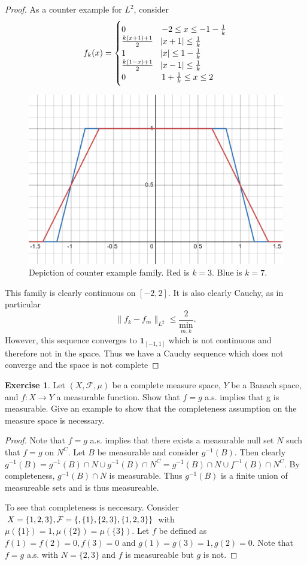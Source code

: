 \documentclass{amsart}
\theoremstyle{plain}
\theoremstyle{definition}
\newtheorem{exer}{Exercise}[section]
\begin{document}
\begin{proof}
    \par As a counter example for $L^2$, consider
    $$f_k(x) = \begin{cases}
        0 & -2\leq x \leq -1-\frac{1}{k}\\
        \frac{k(x+1)+1}{2}& \abs{x+1}\leq \frac{1}{k}\\
        1 & \abs{x}\leq 1-\frac{1}{k}\\
        \frac{k(1-x)+1}{2}& \abs{x-1}\leq \frac{1}{k}\\
        0 & 1+\frac{1}{k}\leq x\leq 2
    \end{cases}$$
    \begin{figure}[h!]
        \centering
        \includegraphics[width=0.5\linewidth]{Exercises/Chapter 1/Photos/Problem1Counter.png}
        \caption{Depiction of counter example family. Red is $k=3$. Blue is $k=7$.}
        \label{fig:Problem_1_counter}
    \end{figure}
    This family is clearly continuous on $[-2,2].$ It is also clearly Cauchy, as in particular
    $$\|f_k - f_m\|_{L^2} \leq \frac{2}{\min_{m,k}}.$$
    However, this sequence converges to $\mathbf{1}_{[-1,1]}$ which is not continuous and therefore not in the space. Thus we have a Cauchy sequence which does not converge and the space is not complete
\end{proof}

\begin{exer}
    Let $\left(X,\mathcal{F},\mu \right)$ be a complete measure space, $Y$ be a Banach space, and $f : X \to Y$ a measurable function. Show that $f = g$ a.s. implies that g is measurable. Give an example to show that the completeness assumption on the measure space is necessary.
\end{exer}
\begin{proof}
Note that $f= g$ a.s. implies that there exists a measurable null set $N$ such that $f=g$ on $N^C$. Let $B$ be measurable and consider $g^{-1}(B).$ Then clearly $g^{-1}(B) = g^{-1}(B)\cap N \cup g^{-1}(B) \cap N^C = g^{-1}(B)\cap N \cup f^{-1}(B) \cap N^C.$ By completeness, $g^{-1}(B)\cap N$ is measurable. Thus $g^{-1}(B)$ is a finite union of measureable sets and is thus measureable. 
\par To see that completeness is neccesary. Consider $X = \{1,2,3\}, \mathcal{F} = \{\empty,\{1\},\{2,3\},\{1,2,3\}\}$ with $\mu\left(\{1\}\right) = 1, \mu\left(\{2\}\right)=\mu\left(\{3\}\right).$ Let $f$ be defined as $f(1) = f(2) = 0, f(3) = 0$ and $g(1)=g(3) = 1, g(2) = 0$. Note that $f = g$ a.s. with $N = \{2,3\}$ and $f$ is measureable but $g$ is not.  
\end{proof}
\end{document}
